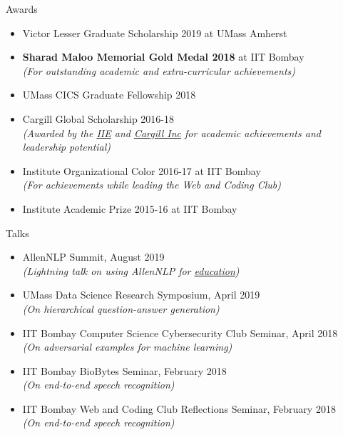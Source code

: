\documentclass{resume} %
\begin{document}
\begin{rSection}{Awards}
\vspace*{0.1in}
\begin{itemize}[leftmargin=*]
\item Victor Lesser Graduate Scholarship 2019 at UMass Amherst
\item \textbf{Sharad Maloo Memorial Gold Medal 2018} at IIT Bombay\\
\textit{(For outstanding academic and extra-curricular achievements)}
\item UMass CICS Graduate Fellowship 2018
\item Cargill Global Scholarship 2016-18 \\
\textit{(Awarded by the \href{https://en.wikipedia.org/wiki/Institute_of_International_Education}{IIE} and \href{https://en.wikipedia.org/wiki/Cargill}{Cargill Inc} for academic achievements and leadership potential)}
\item Institute Organizational Color 2016-17 at IIT Bombay \\
\textit{(For achievements while leading the Web and Coding Club)}
\item Institute Academic Prize 2015-16 at IIT Bombay
\end{itemize}
\end{rSection}

\begin{rSection}{Talks}
\vspace*{0.1in}
\begin{itemize}[leftmargin=*]
\item AllenNLP Summit, August 2019 \\
\textit{(Lightning talk on using AllenNLP for \href{https://github.com/martiansideofthemoon/allennlp-probe-hw}{education})}
\item UMass Data Science Research Symposium, April 2019 \\
\textit{(On hierarchical question-answer generation)}
\item IIT Bombay Computer Science Cybersecurity Club Seminar, April 2018 \\
\textit{(On adversarial examples for machine learning)}
\item IIT Bombay BioBytes Seminar, February 2018\\
\textit{(On end-to-end speech recognition)}
\item IIT Bombay Web and Coding Club Reflections Seminar, February 2018 \\
\textit{(On end-to-end speech recognition)}
\end{itemize}
\end{rSection}
\end{document}
